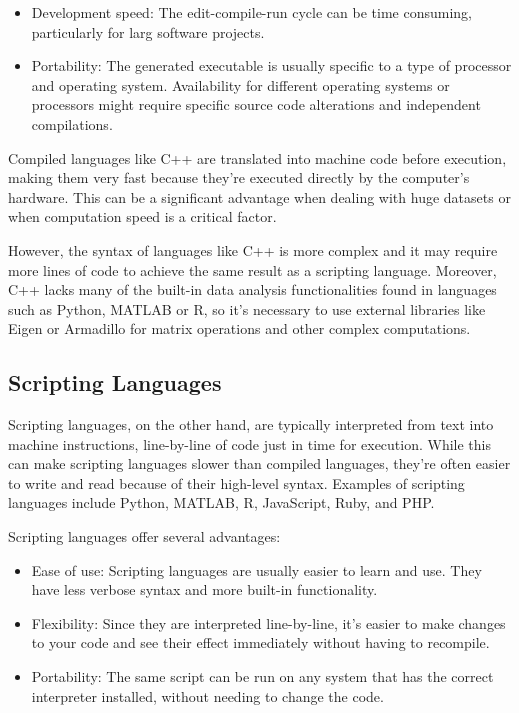 \begin{itemize}
	\item Development speed: The edit-compile-run cycle can be time consuming, particularly for larg software projects.
	\item Portability: The generated executable is usually specific to a type of processor and operating system. Availability for different operating systems or processors might require specific source code alterations and independent compilations. 
\end{itemize}

Compiled languages like C++ are translated into machine code before execution, making them very fast because they're executed directly by the computer's hardware. This can be a significant advantage when dealing with huge datasets or when computation speed is a critical factor. 

However, the syntax of languages like C++ is more complex and it may require more lines of code to achieve the same result as a scripting language. Moreover, C++ lacks many of the built-in data analysis functionalities found in languages such as Python, MATLAB or R, so it's necessary to use external libraries like Eigen or Armadillo for matrix operations and other complex computations.

\subsection{Scripting Languages}

Scripting languages, on the other hand, are typically interpreted from text into machine instructions, line-by-line of code just in time for execution. While this can make scripting languages slower than compiled languages, they're often easier to write and read because of their high-level syntax.  Examples of scripting languages include Python, MATLAB, R, JavaScript, Ruby, and PHP.

Scripting languages offer several advantages:

\begin{itemize}
	\item Ease of use: Scripting languages are usually easier to learn and use. They have less verbose syntax and more built-in functionality.
	\item Flexibility: Since they are interpreted line-by-line, it's easier to make changes to your code and see their effect immediately without having to recompile.
	\item Portability: The same script can be run on any system that has the correct interpreter installed, without needing to change the code.
\end{itemize}

